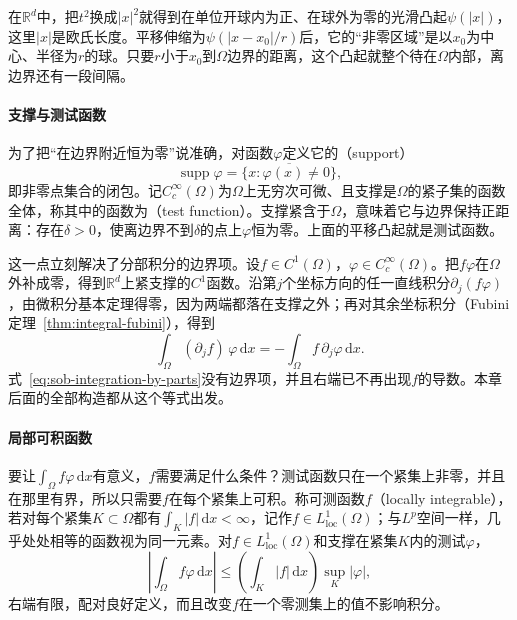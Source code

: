 在$\mathbb R^d$中，把$t^2$换成$|x|^2$就得到在单位开球内为正、在球外为零的光滑凸起$\psi(|x|)$，这里$|x|$是欧氏长度。平移伸缩为$\psi(|x-x_0|/r)$后，它的“非零区域”是以$x_0$为中心、半径为$r$的球。只要$r$小于$x_0$到$\Omega$边界的距离，这个凸起就整个待在$\Omega$内部，离边界还有一段间隔。

\paragraph{支撑与测试函数}
为了把“在边界附近恒为零”说准确，对函数$\varphi$定义它的（support）
\[
 \operatorname{supp}\varphi=\overline{\{x:\varphi(x)\neq0\}},
\]
即非零点集合的闭包。记$C_c^\infty(\Omega)$为$\Omega$上无穷次可微、且支撑是$\Omega$的紧子集的函数全体，称其中的函数为（test function）。支撑紧含于$\Omega$，意味着它与边界保持正距离：存在$\delta>0$，使离边界不到$\delta$的点上$\varphi$恒为零。上面的平移凸起就是测试函数。

这一点立刻解决了分部积分的边界项。设$f\in C^1(\Omega)$，$\varphi\in C_c^\infty(\Omega)$。把$f\varphi$在$\Omega$外补成零，得到$\mathbb R^d$上紧支撑的$C^1$函数。沿第$j$个坐标方向的任一直线积分$\partial_j(f\varphi)$，由微积分基本定理得零，因为两端都落在支撑之外；再对其余坐标积分（Fubini定理~\ref{thm:integral-fubini}），得到
\begin{equation}
 \int_\Omega(\partial_jf)\,\varphi\,\mathrm dx=-\int_\Omega f\,\partial_j\varphi\,\mathrm dx .
 \label{eq:sob-integration-by-parts}
\end{equation}
式~\eqref{eq:sob-integration-by-parts}没有边界项，并且右端已不再出现$f$的导数。本章后面的全部构造都从这个等式出发。

\paragraph{局部可积函数}
要让$\int_\Omega f\varphi\,\mathrm dx$有意义，$f$需要满足什么条件？测试函数只在一个紧集上非零，并且在那里有界，所以只需要$f$在每个紧集上可积。称可测函数$f$（locally integrable），若对每个紧集$K\subset\Omega$都有$\int_K|f|\,\mathrm dx<\infty$，记作$f\in L^1_{\mathrm{loc}}(\Omega)$；与$L^p$空间一样，几乎处处相等的函数视为同一元素。对$f\in L^1_{\mathrm{loc}}(\Omega)$和支撑在紧集$K$内的测试$\varphi$，
\begin{equation}
 \left|\int_\Omega f\varphi\,\mathrm dx\right|\le\left(\int_K|f|\,\mathrm dx\right)\sup_K|\varphi| ,
 \label{eq:sob-local-pairing}
\end{equation}
右端有限，配对良好定义，而且改变$f$在一个零测集上的值不影响积分。

